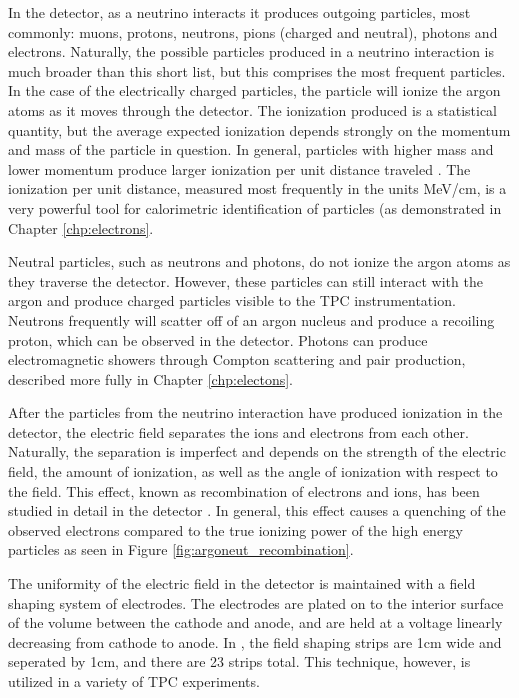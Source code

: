 In the detector, as a neutrino interacts it produces outgoing particles, most commonly: muons, protons, neutrons, pions (charged and neutral), photons and electrons.  Naturally, the possible particles produced in a neutrino interaction is much broader than this short list, but this comprises the most frequent particles.  In the case of the electrically charged particles, the particle will ionize the argon atoms as it moves through the detector.  The ionization produced is a statistical quantity, but the average expected ionization depends strongly on the momentum and mass of the particle in question.  In general, particles with higher mass and lower momentum produce larger ionization per unit distance traveled \cite{bethe-bloch}.  The ionization per unit distance, measured most frequently in the units MeV/cm, is a very powerful tool for calorimetric identification of particles (as demonstrated in Chapter \ref{chp:electrons}.

Neutral particles, such as neutrons and photons, do not ionize the argon atoms as they traverse the detector.  However, these particles can still interact with the argon and produce charged particles visible to the TPC instrumentation.  Neutrons frequently will scatter off of an argon nucleus and produce a recoiling proton, which can be observed in the detector.  Photons can produce electromagnetic showers through Compton scattering and pair production, described more fully in Chapter \ref{chp:electons}.

After the particles from the neutrino interaction have produced ionization in the detector, the electric field separates the ions and electrons from each other.  Naturally, the separation is imperfect and depends on the strength of the electric field, the amount of ionization, as well as the angle of ionization with respect to the field.  This effect, known as recombination of electrons and ions, has been studied in detail in the \argoneut detector \cite{Acciarri:2013met}.  In general, this effect causes a quenching of the observed electrons compared to the true ionizing power of the high energy particles as seen in Figure \ref{fig:argoneut_recombination}.

The uniformity of the electric field in the \argoneut detector is maintained with a field shaping system of electrodes.  The electrodes are plated on  to the interior surface of the volume between the cathode and anode, and are held at a voltage linearly decreasing from cathode to anode.  In \argoneut, the field shaping strips are 1cm wide and seperated by 1cm, and there are 23 strips total.  This technique, however, is utilized in a variety of TPC experiments.

